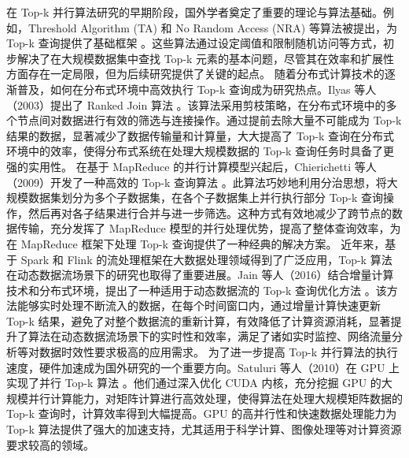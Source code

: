 
在 Top-k 并行算法研究的早期阶段，国外学者奠定了重要的理论与算法基础。例如，Threshold Algorithm (TA) 和 No Random Access (NRA) 等算法被提出，为 Top-k 查询提供了基础框架 \cite {fagin2001optimal}。这些算法通过设定阈值和限制随机访问等方式，初步解决了在大规模数据集中查找 Top-k 元素的基本问题，尽管其在效率和扩展性方面存在一定局限，但为后续研究提供了关键的起点。
随着分布式计算技术的逐渐普及，如何在分布式环境中高效执行 Top-k 查询成为研究热点。Ilyas 等人（2003）提出了 Ranked Join 算法 \cite {ilyas2003ranked}。该算法采用剪枝策略，在分布式环境中的多个节点间对数据进行有效的筛选与连接操作。通过提前去除大量不可能成为 Top-k 结果的数据，显著减少了数据传输量和计算量，大大提高了 Top-k 查询在分布式环境中的效率，使得分布式系统在处理大规模数据的 Top-k 查询任务时具备了更强的实用性。
在基于 MapReduce 的并行计算模型兴起后，Chierichetti 等人（2009）开发了一种高效的 Top-k 查询算法 \cite {chierichetti2009fast}。此算法巧妙地利用分治思想，将大规模数据集划分为多个子数据集，在各个子数据集上并行执行部分 Top-k 查询操作，然后再对各子结果进行合并与进一步筛选。这种方式有效地减少了跨节点的数据传输，充分发挥了 MapReduce 模型的并行处理优势，提高了整体查询效率，为在 MapReduce 框架下处理 Top-k 查询提供了一种经典的解决方案。
近年来，基于 Spark 和 Flink 的流处理框架在大数据处理领域得到了广泛应用，Top-k 算法在动态数据流场景下的研究也取得了重要进展。Jain 等人（2016）结合增量计算技术和分布式环境，提出了一种适用于动态数据流的 Top-k 查询优化方法 \cite {jain2016apache}。该方法能够实时处理不断流入的数据，在每个时间窗口内，通过增量计算快速更新 Top-k 结果，避免了对整个数据流的重新计算，有效降低了计算资源消耗，显著提升了算法在动态数据流场景下的实时性和效率，满足了诸如实时监控、网络流量分析等对数据时效性要求极高的应用需求。
为了进一步提高 Top-k 并行算法的执行速度，硬件加速成为国外研究的一个重要方向。Satuluri 等人（2010）在 GPU 上实现了并行 Top-k 算法 \cite {satuluri2010parallel}。他们通过深入优化 CUDA 内核，充分挖掘 GPU 的大规模并行计算能力，对矩阵计算进行高效处理，使得算法在处理大规模矩阵数据的 Top-k 查询时，计算效率得到大幅提高。GPU 的高并行性和快速数据处理能力为 Top-k 算法提供了强大的加速支持，尤其适用于科学计算、图像处理等对计算资源要求较高的领域。
